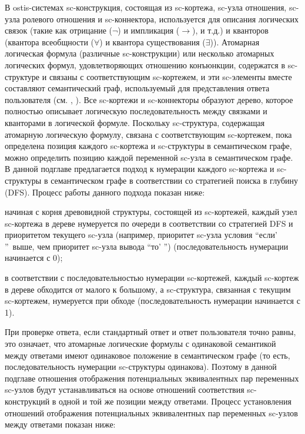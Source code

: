 В ostis-системах sc-конструкция, состоящая из sc-кортежа, sc-узла отношения, sc-узла ролевого отношения и sc-коннектора, используется для описания логических связок (такие как отрицание ($\lnot$) и импликация ($\to$), и т.д.) и кванторов (квантора всеобщности ($\forall$) и квантора существования ($\exists$)). Атомарная логическая формула (различные sc-конструкции) или несколько атомарных логических формул, удовлетворяющих отношению конъюнкции, содержатся в sc-структуре и связаны с соответствующим sc-кортежем, и эти sc-элементы вместе составляют семантический граф, используемый для представления ответа пользователя (см. , ). Все sc-кортежи и sc-коннекторы образуют дерево, которое полностью описывает логическую последовательность между связками и кванторами в логической формуле. Поскольку sc-структура, содержащая атомарную логическую формулу, связана с соответствующим sc-кортежем, пока определена позиция каждого sc-кортежа и sc-структуры в семантическом графе, можно определить позицию каждой переменной sc-узла в семантическом графе. В данной подглаве предлагается подход к нумерации каждого sc-кортежа и sc-структуры в семантическом графе в соответствии со стратегией поиска в глубину (DFS). Процесс работы данного подхода показан ниже:

\begin{textitemize}
	\item начиная с корня древовидной структуры, состоящей из sc-кортежей, каждый узел sc-кортежа в дереве нумеруется по очереди в соответствии со стратегией DFS и приоритетом текущего sc-узла (например, приоритет sc-узла условия ``если' ''\ выше, чем приоритет sc-узла вывода ``то' '') (последовательность нумерации начинается с 0);
	\item в соответствии с последовательностью нумерации sc-кортежей, каждый sc-кортеж в дереве обходится от малого к большому, а sc-структура, связанная с текущим sc-кортежем, нумеруется при обходе (последовательность нумерации начинается с 1).
\end{textitemize}

При проверке ответа, если стандартный ответ и ответ пользователя точно равны, это означает, что атомарные логические формулы с одинаковой семантикой между ответами имеют одинаковое положение в семантическом графе (то есть, последовательность нумерации sc-структуры одинакова). Поэтому в данной подглаве отношения отображения потенциальных эквивалентных пар переменных sc-узлов будут устанавливаться на основе отношений соответствия sc-конструкций в одной и той же позиции между ответами. Процесс установления отношений отображения потенциальных эквивалентных пар переменных sc-узлов между ответами показан ниже:

